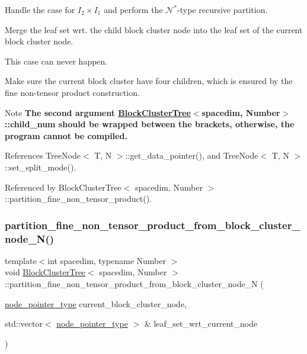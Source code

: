 Handle the case for $I_2 \times I_1$ and perform the $\mathcal{N}^*$-\/type recursive partition.

Merge the leaf set wrt. the child block cluster node into the leaf set of the current block cluster node.

This case can never happen.

Make sure the current block cluster have four children, which is ensured by the fine non-\/tensor product construction.


\begin{DoxyDescription}
\item[Note ]{\bfseries The second argument {\ttfamily \hyperlink{classBlockClusterTree}{Block\+Cluster\+Tree}$<$spacedim}, Number$>$\+::child\+\_\+num should be wrapped between the brackets, otherwise, the program cannot be compiled.} 
\end{DoxyDescription}

References Tree\+Node$<$ T, N $>$\+::get\+\_\+data\+\_\+pointer(), and Tree\+Node$<$ T, N $>$\+::set\+\_\+split\+\_\+mode().



Referenced by Block\+Cluster\+Tree$<$ spacedim, Number $>$\+::partition\+\_\+fine\+\_\+non\+\_\+tensor\+\_\+product().

\mbox{\label{classBlockClusterTree_aafad0fae48bf7c462e8e943b76893fc0}} 
\subsubsection{\texorpdfstring{partition\+\_\+fine\+\_\+non\+\_\+tensor\+\_\+product\+\_\+from\+\_\+block\+\_\+cluster\+\_\+node\+\_\+\+N()}{partition\_fine\_non\_tensor\_product\_from\_block\_cluster\_node\_N()}}
{\footnotesize\ttfamily template$<$int spacedim, typename Number $>$ \\
void \hyperlink{classBlockClusterTree}{Block\+Cluster\+Tree}$<$ spacedim, Number $>$\+::partition\+\_\+fine\+\_\+non\+\_\+tensor\+\_\+product\+\_\+from\+\_\+block\+\_\+cluster\+\_\+node\+\_\+N (\begin{DoxyParamCaption}\item[{\hyperlink{classTreeNode}{node\+\_\+pointer\+\_\+type}}]{current\+\_\+block\+\_\+cluster\+\_\+node,  }\item[{std\+::vector$<$ \hyperlink{classTreeNode}{node\+\_\+pointer\+\_\+type} $>$ \&}]{leaf\+\_\+set\+\_\+wrt\+\_\+current\+\_\+node }\end{DoxyParamCaption})\hspace{0.3cm}{\ttfamily [private]}}

